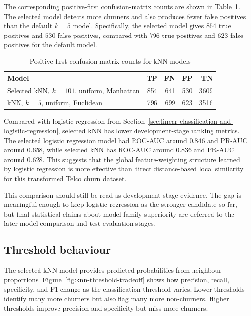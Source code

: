 The corresponding positive-first confusion-matrix counts are shown in Table~\ref{tab:knn-confusion}. The selected model detects more churners and also produces fewer false positives than the default \(k=5\) model. Specifically, the selected model gives \(854\) true positives and \(530\) false positives, compared with \(796\) true positives and \(623\) false positives for the default model.

\begin{table}[H]
\centering
\small
\begin{tabular}{lrrrr}
\toprule
Model & TP & FN & FP & TN \\
\midrule
Selected kNN, \(k=101\), uniform, Manhattan & 854 & 641 & 530 & 3609 \\
kNN, \(k=5\), uniform, Euclidean & 796 & 699 & 623 & 3516 \\
\bottomrule
\end{tabular}
\caption{Positive-first confusion-matrix counts for kNN models}
\label{tab:knn-confusion}
\end{table}

Compared with logistic regression from Section~\ref{sec:linear-classification-and-logistic-regression}, selected kNN has lower development-stage ranking metrics. The selected logistic regression model had ROC-AUC around \(0.846\) and PR-AUC around \(0.658\), while selected kNN has ROC-AUC around \(0.836\) and PR-AUC around \(0.628\). This suggests that the global feature-weighting structure learned by logistic regression is more effective than direct distance-based local similarity for this transformed Telco churn dataset.

This comparison should still be read as development-stage evidence. The gap is meaningful enough to keep logistic regression as the stronger candidate so far, but final statistical claims about model-family superiority are deferred to the later model-comparison and test-evaluation stages.

\subsection{Threshold behaviour}

The selected kNN model provides predicted probabilities from neighbour proportions. Figure~\ref{fig:knn-threshold-tradeoff} shows how precision, recall, specificity, and F1 change as the classification threshold varies. Lower thresholds identify many more churners but also flag many more non-churners. Higher thresholds improve precision and specificity but miss more churners.

